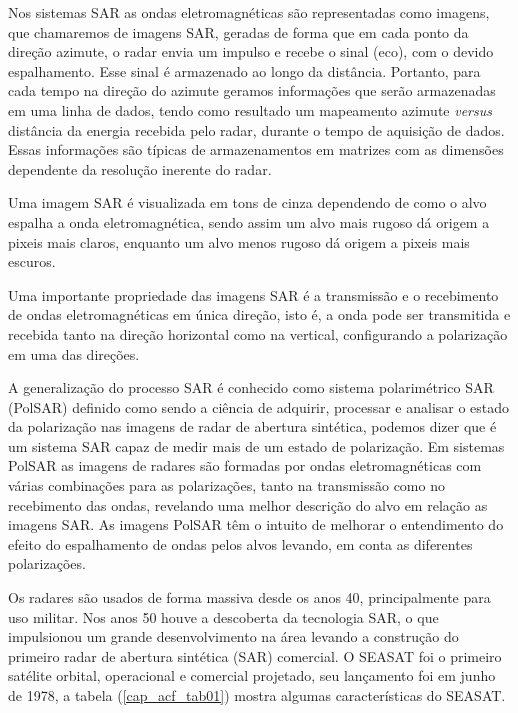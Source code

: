 Nos sistemas SAR as ondas eletromagnéticas são representadas como imagens, que chamaremos de imagens SAR, geradas de forma que em cada ponto da direção azimute, o radar envia um impulso e recebe o sinal (eco), com o devido espalhamento. Esse sinal é armazenado ao longo da distância. Portanto, para cada tempo na direção do azimute geramos informações que serão armazenadas em uma linha de dados, tendo como resultado um mapeamento azimute \textit{versus} distância da energia recebida pelo radar, durante o tempo de aquisição de dados. Essas informações são típicas de armazenamentos em matrizes com as dimensões dependente da resolução inerente do radar.

Uma imagem SAR é visualizada em tons de cinza dependendo de como o alvo espalha a onda eletromagnética, sendo assim um alvo mais rugoso dá origem a pixeis mais claros, enquanto um alvo menos rugoso dá origem a pixeis mais escuros. 

Uma importante propriedade das imagens SAR é a transmissão e o recebimento de ondas eletromagnéticas em única direção, isto é, a onda pode ser transmitida e recebida tanto na direção horizontal como na vertical, configurando a polarização em uma das direções.

A generalização do processo SAR é conhecido como sistema polarimétrico SAR (PolSAR) definido como sendo a ciência de adquirir, processar e analisar o estado da polarização nas imagens de radar de abertura sintética, podemos dizer que é um sistema SAR capaz de medir mais de um estado de polarização. Em sistemas PolSAR as imagens de radares são formadas por ondas eletromagnéticas com várias combinações para as polarizações, tanto na transmissão como no recebimento das ondas, revelando uma melhor descrição do alvo em relação as imagens SAR. As imagens PolSAR têm o intuito de melhorar o entendimento do efeito do espalhamento de ondas pelos alvos levando, em conta as diferentes polarizações.

Os radares são usados de forma massiva desde os anos 40, principalmente para uso militar. Nos anos 50 houve a descoberta da tecnologia SAR, o que impulsionou um grande desenvolvimento na área levando a construção do primeiro radar de abertura sintética (SAR) comercial. O SEASAT foi o primeiro satélite orbital, operacional  e comercial projetado, seu lançamento foi em junho de 1978, a tabela (\ref{cap_acf_tab01}) mostra algumas características do SEASAT. 

